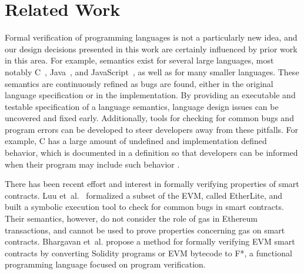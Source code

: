 \section{Related Work}
Formal verification of programming languages is not a particularly new idea,
and our design decisions presented in this work are certainly influenced by
prior work in this area. For example, \K{} semantics exist for several large languages, most notably
C~\cite{ellison-2012-thesis}, Java~\cite{bogdanas-rosu-2015-popl}, and
JavaScript~\cite{park-stefanescu-rosu-pldi}, as well as for many smaller languages. These semantics are
continuously refined as bugs are found, either in the original language
specification or in the \K{} implementation. By providing an executable and
testable specification of a language semantics, language design issues can be
uncovered and fixed early. Additionally, tools for checking for common bugs and
program errors can be developed to steer developers away from these pitfalls.
For example, C has a large amount of undefined and implementation defined
behavior, which is documented in a \K{} definition so that developers can be
informed when their program may include such behavior
\cite{guth-hathhorn-saxena-rosu-2016-cav}.

There has been recent effort and interest in formally verifying properties of
smart contracts. Luu et~al.~\cite{luumaking} formalized a subset of the EVM,
called EtherLite, and built a symbolic execution tool to check for common bugs
in smart contracts. Their semantics, however, do not consider the role of gas in
Ethereum transactions, and cannot be used to prove properties concerning gas on
smart contracts. Bhargavan et~al.\cite{evmf*} propose a method for formally
verifying EVM smart contracts by converting Solidity programs or EVM bytecode to
F*, a functional programming language focused on program verification.
